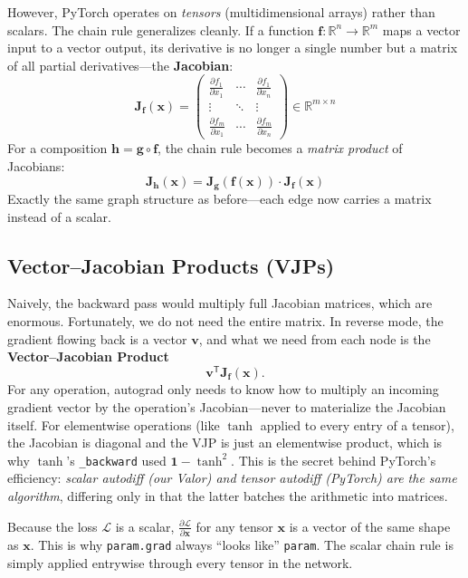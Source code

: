 \documentclass{tufte-handout}
\let\subsubsection\subsection
\begin{document}
However, PyTorch operates on \textit{tensors} (multidimensional arrays) rather than scalars. The chain rule generalizes cleanly. If a function $\mathbf{f}: \mathbb{R}^n \to \mathbb{R}^m$ maps a vector input to a vector output, its derivative is no longer a single number but a matrix of all partial derivatives---the \textbf{Jacobian}:
\[
\mathbf{J}_{\mathbf{f}}(\mathbf{x}) = \begin{pmatrix}
\frac{\partial f_1}{\partial x_1} & \cdots & \frac{\partial f_1}{\partial x_n} \\
\vdots & \ddots & \vdots \\
\frac{\partial f_m}{\partial x_1} & \cdots & \frac{\partial f_m}{\partial x_n}
\end{pmatrix} \in \mathbb{R}^{m \times n}
\]
For a composition $\mathbf{h} = \mathbf{g} \circ \mathbf{f}$, the chain rule becomes a \emph{matrix product} of Jacobians:
\[
\mathbf{J}_{\mathbf{h}}(\mathbf{x}) = \mathbf{J}_{\mathbf{g}}(\mathbf{f}(\mathbf{x})) \cdot \mathbf{J}_{\mathbf{f}}(\mathbf{x})
\]
Exactly the same graph structure as before---each edge now carries a matrix instead of a scalar.

\subsubsection{Vector--Jacobian Products (VJPs)}

Naively, the backward pass would multiply full Jacobian matrices, which are enormous. Fortunately, we do not need the entire matrix. In reverse mode, the gradient flowing back is a vector $\mathbf{v}$, and what we need from each node is the \textbf{Vector--Jacobian Product}
\[
\mathbf{v}^{\mathsf{T}} \mathbf{J}_{\mathbf{f}}(\mathbf{x}).
\]
For any operation, autograd only needs to know how to multiply an incoming gradient vector by the operation's Jacobian---never to materialize the Jacobian itself. For elementwise operations (like $\tanh$ applied to every entry of a tensor), the Jacobian is diagonal and the VJP is just an elementwise product, which is why $\tanh$'s \texttt{\_backward} used $\mathbf{1}-\tanh^2$. This is the secret behind PyTorch's efficiency: \emph{scalar autodiff (our Valor) and tensor autodiff (PyTorch) are the same algorithm}, differing only in that the latter batches the arithmetic into matrices.

\begin{remark}
Because the loss $\mathcal{L}$ is a scalar, $\frac{\partial \mathcal{L}}{\partial \mathbf{x}}$ for any tensor $\mathbf{x}$ is a vector of the same shape as $\mathbf{x}$. This is why \texttt{param.grad} always ``looks like'' \texttt{param}. The scalar chain rule is simply applied entrywise through every tensor in the network.
\end{remark}
\end{document}
